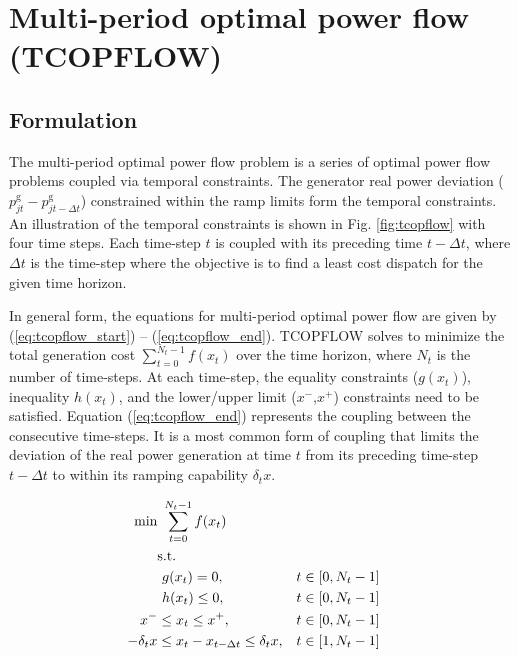 \chapter{Multi-period optimal power flow (TCOPFLOW)}\label{chap:tcopflow}
\todo

\section{Formulation}
The multi-period optimal power flow problem is a series of optimal power flow problems coupled via temporal constraints. The generator real power deviation ($p_{jt}^{\text{g}} - p_{jt-\Delta{t}}^{\text{g}}$) constrained within the ramp limits form the temporal constraints. An illustration of the temporal constraints is shown in Fig. \ref{fig:tcopflow} with four time steps. Each time-step $t$ is coupled with its preceding time $t-\Delta{t}$, where $\Delta{t}$ is the time-step where the objective is to find a least cost dispatch for the given time horizon.



In general form, the equations for multi-period optimal power flow are given by
(\ref{eq:tcopflow_start}) -- (\ref{eq:tcopflow_end}). TCOPFLOW solves to minimize the total generation cost $\sum_{t=0}^{N_t-1}f(x_t)$ over the time horizon, where $N_t$ is the number of time-steps. At each time-step, the equality constraints ($g(x_t)$), inequality $h(x_t)$, and the lower/upper limit ($x^-$,$x^+$) constraints need to be satisfied. Equation (\ref{eq:tcopflow_end}) represents the coupling between the consecutive time-steps. It is a most common form of coupling that limits the deviation of the real power generation at time $t$ from its preceding time-step $t-\Delta{t}$ to within its ramping capability $\delta_t{x}$.


\begin{align}
\centering
\text{min}&~\sum_{t=0}^{N_t-1} f(x_t) &  \label{eq:tcopflow_start}\\
&\text{s.t.}& \nonumber \\
&~g(x_t) = 0,                                        &t \in \left[0,N_t-1\right]& \\
&~h(x_t) \le 0,                                      &t \in \left[0,N_t-1\right]& \\
x^- & \le x_t \le x^+,                               &t\in \left[0,N_t-1\right]& \\
-\delta_t{x} & \le x_t - x_{t-\Delta{t}} \le \delta_t{x},&t \in \left[1,N_t-1\right]&
\label{eq:tcopflow_end}
\end{align}

